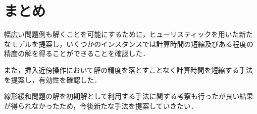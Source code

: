 \chapter{まとめ}\label{conclution}
幅広い問題例も解くことを可能にするために，ヒューリスティックを用いた新たなモデルを提案し，いくつかのインスタンスでは計算時間の短縮及びある程度の精度の解を得ることができることを確認した．

また，挿入近傍操作において解の精度を落とすことなく計算時間を短縮する手法を提案し，有効性を確認した．

線形緩和問題の解を初期解として利用する手法に関する考察も行ったが良い結果が得られなかったため，今後新たな手法を提案していきたい．
